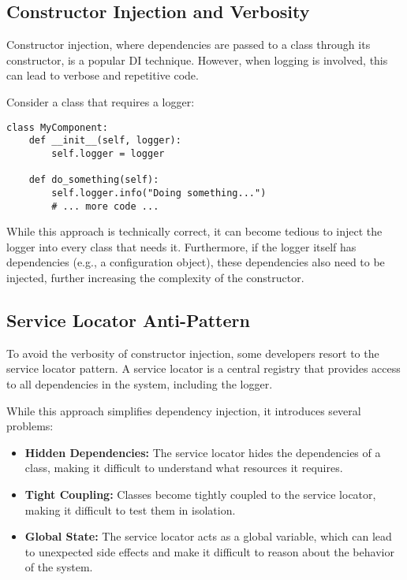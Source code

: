 \documentclass{article}
\begin{document}
{{{{\subsection*{Constructor Injection and Verbosity}

Constructor injection, where dependencies are passed to a class through its constructor, is a popular DI technique.  However, when logging is involved, this can lead to verbose and repetitive code.

Consider a class that requires a logger:

\begin{verbatim}
class MyComponent:
    def __init__(self, logger):
        self.logger = logger

    def do_something(self):
        self.logger.info("Doing something...")
        # ... more code ...
\end{verbatim}

While this approach is technically correct, it can become tedious to inject the logger into every class that needs it.  Furthermore, if the logger itself has dependencies (e.g., a configuration object), these dependencies also need to be injected, further increasing the complexity of the constructor.

\subsection*{Service Locator Anti-Pattern}

To avoid the verbosity of constructor injection, some developers resort to the service locator pattern.  A service locator is a central registry that provides access to all dependencies in the system, including the logger.

While this approach simplifies dependency injection, it introduces several problems:

\begin{itemize}
    \item \textbf{Hidden Dependencies:}  The service locator hides the dependencies of a class, making it difficult to understand what resources it requires.
    \item \textbf{Tight Coupling:}  Classes become tightly coupled to the service locator, making it difficult to test them in isolation.
    \item \textbf{Global State:}  The service locator acts as a global variable, which can lead to unexpected side effects and make it difficult to reason about the behavior of the system.
\end{itemize}

}}}}
\end{document}
